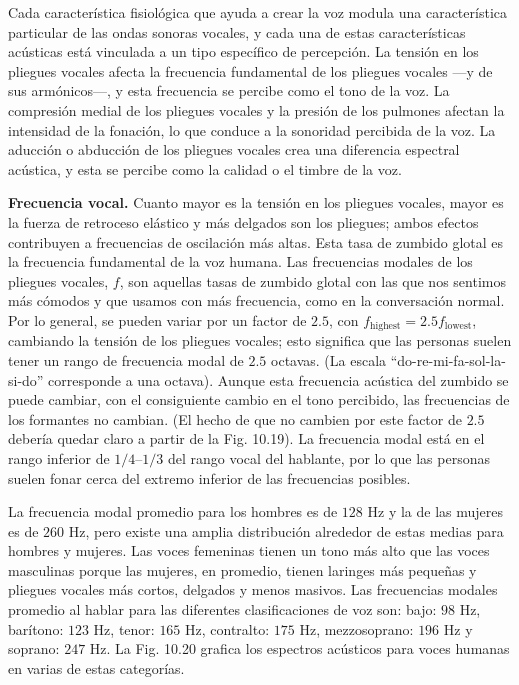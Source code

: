 \documentclass[12pt]{book}
\begin{document}
Cada característica fisiológica que ayuda a crear la voz modula una característica particular de las ondas sonoras vocales, y cada una de estas características acústicas está vinculada a un tipo específico de percepción. La tensión en los pliegues vocales afecta la frecuencia fundamental de los pliegues vocales ---y de sus armónicos---, y esta frecuencia se percibe como el tono de la voz. La compresión medial de los pliegues vocales y la presión de los pulmones afectan la intensidad de la fonación, lo que conduce a la sonoridad percibida de la voz. La aducción o abducción de los pliegues vocales crea una diferencia espectral acústica, y esta se percibe como la calidad o el timbre de la voz.

\textbf{Frecuencia vocal.} Cuanto mayor es la tensión en los pliegues vocales, mayor es la fuerza de retroceso elástico y más delgados son los pliegues; ambos efectos contribuyen a frecuencias de oscilación más altas. Esta tasa de zumbido glotal es la frecuencia fundamental de la voz humana. Las frecuencias modales de los pliegues vocales, $f$, son aquellas tasas de zumbido glotal con las que nos sentimos más cómodos y que usamos con más frecuencia, como en la conversación normal. Por lo general, se pueden variar por un factor de $2.5$, con $f_{\text{highest}} = 2.5 f_{\text{lowest}}$, cambiando la tensión de los pliegues vocales; esto significa que las personas suelen tener un rango de frecuencia modal de $2.5$ octavas. (La escala ``do-re-mi-fa-sol-la-si-do'' corresponde a una octava). Aunque esta frecuencia acústica del zumbido se puede cambiar, con el consiguiente cambio en el tono percibido, las frecuencias de los formantes no cambian. (El hecho de que no cambien por este factor de $2.5$ debería quedar claro a partir de la Fig. 10.19). La frecuencia modal está en el rango inferior de $1/4\text{--}1/3$ del rango vocal del hablante, por lo que las personas suelen fonar cerca del extremo inferior de las frecuencias posibles.

La frecuencia modal promedio para los hombres es de $128\text{ Hz}$ y la de las mujeres es de $260\text{ Hz}$, pero existe una amplia distribución alrededor de estas medias para hombres y mujeres. Las voces femeninas tienen un tono más alto que las voces masculinas porque las mujeres, en promedio, tienen laringes más pequeñas y pliegues vocales más cortos, delgados y menos masivos. Las frecuencias modales promedio al hablar para las diferentes clasificaciones de voz son: bajo: $98\text{ Hz}$, barítono: $123\text{ Hz}$, tenor: $165\text{ Hz}$, contralto: $175\text{ Hz}$, mezzosoprano: $196\text{ Hz}$ y soprano: $247\text{ Hz}$. La Fig. 10.20 grafica los espectros acústicos para voces humanas en varias de estas categorías.
\end{document}
